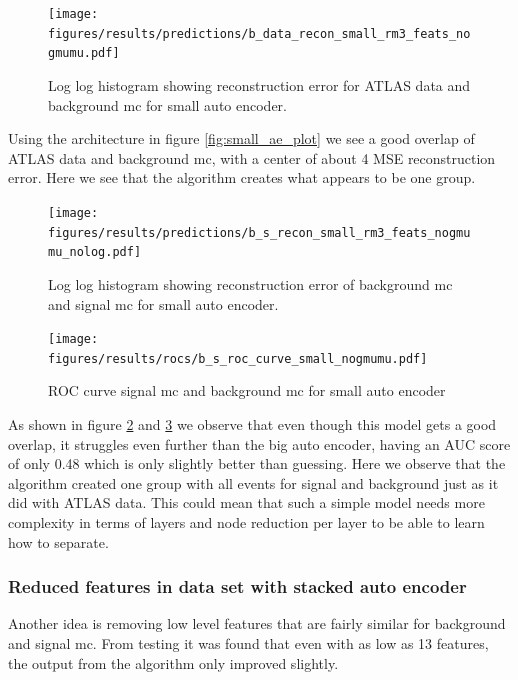 \documentclass[ reprint, amsmath,amssymb, aps, nofootinbib]{revtex4-2}
\begin{document}
\begin{figure}[H]
     \centering
         \texttt{[image: figures/results/predictions/b\_data\_recon\_small\_rm3\_feats\_nogmumu.pdf]}
         \caption{Log log histogram showing reconstruction error for ATLAS data and background mc for small auto encoder. }
     \label{fig:data_b_small_pred}
\end{figure}


Using the architecture in figure \ref{fig:small_ae_plot} we see a good overlap of ATLAS data and background mc, with a center of about 4 MSE reconstruction error. Here we see that the algorithm creates what appears to be one group. 

\begin{figure}[H]    
 \centering
    \texttt{[image: figures/results/predictions/b\_s\_recon\_small\_rm3\_feats\_nogmumu\_nolog.pdf]}
    \caption{Log log histogram showing reconstruction error of background mc and signal mc for small auto encoder. }
    \label{fig:s_b_small_pred_}   
  
\end{figure}

\begin{figure}[H]    
  \centering
         \texttt{[image: figures/results/rocs/b\_s\_roc\_curve\_small\_nogmumu.pdf]}
         \caption{ROC curve signal mc and background mc for small auto encoder}
         \label{fig:s_b_small_roc}  
  
\end{figure}


As shown in figure \ref{fig:s_b_small_pred_} and \ref{fig:s_b_small_roc} we observe that even though this model gets a good overlap, it struggles even further than the big auto encoder, having an AUC score of only 0.48 which is only slightly better than guessing. Here we observe that the algorithm created one group with all events for signal and background just as it did with ATLAS data. This could mean that such a simple model needs more complexity in terms of layers and node reduction per layer to be able to learn how to separate. \par 

\subsubsection{Reduced features in data set with stacked auto encoder}

Another idea is removing low level features that are fairly similar for background and signal mc. From testing it was found that even with as low as 13 features, the output from the algorithm only improved slightly. 
\end{document}
